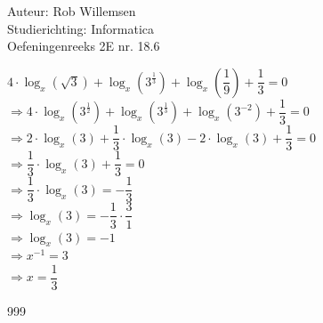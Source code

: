 \documentclass[a4paper]{article}
\begin{document}
\noindent \large Auteur: Rob Willemsen \\
\noindent \large Studierichting: Informatica\\
\noindent \large Oefeningenreeks 2E nr. 18.6\\

\medskip

\normalsize

$4 \cdot \log_x\left(\sqrt{3}\right) + \log_x\left(3^{\tfrac{1}{3}}\right) + \log_x\left(\dfrac{1}{9}\right) + \dfrac{1}{3} = 0$ \\

$\Rightarrow 4 \cdot \log_x\left(3^{\tfrac{1}{2}}\right) + \log_x\left(3^{\tfrac{1}{3}}\right) + \log_x\left(3^{-2}\right) + \dfrac{1}{3} = 0$\\

$\Rightarrow 2 \cdot \log_x(3) + \dfrac{1}{3} \cdot \log_x(3) - 2 \cdot \log_x(3) + \dfrac{1}{3} = 0$\\

$\Rightarrow \dfrac{1}{3} \cdot \log_x(3) + \dfrac{1}{3} = 0$\\

$\Rightarrow \dfrac{1}{3} \cdot \log_x(3) = -\dfrac{1}{3}$\\

$\Rightarrow \log_x(3) = -\dfrac{1}{3} \cdot \dfrac{3}{1}$\\

$\Rightarrow \log_x(3) = -1$\\

$\Rightarrow x^{-1} = 3$\\

$\Rightarrow x = \dfrac{1}{3}$\\

\begin{thebibliography}{999}
\end{thebibliography}
\end{document}
